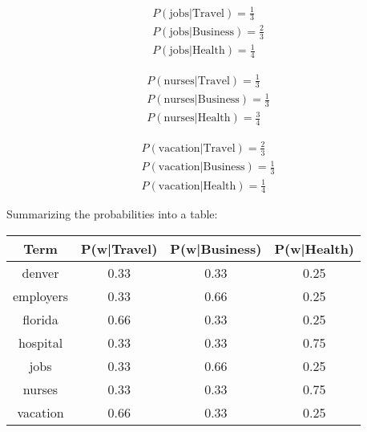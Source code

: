 \documentclass[11pt]{article}
\begin{document}
\begin{enumerate}
        \begin{align*}
            P(\text{jobs}|\text{Travel}) = \frac{1}{3} \\
            P(\text{jobs}|\text{Business}) = \frac{2}{3} \\
            P(\text{jobs}|\text{Health}) = \frac{1}{4}
        \end{align*}

        \begin{align*}
            P(\text{nurses}|\text{Travel}) = \frac{1}{3} \\
            P(\text{nurses}|\text{Business}) = \frac{1}{3} \\
            P(\text{nurses}|\text{Health}) = \frac{3}{4}
        \end{align*}

        \begin{align*}
            P(\text{vacation}|\text{Travel}) = \frac{2}{3} \\
            P(\text{vacation}|\text{Business}) = \frac{1}{3} \\
            P(\text{vacation}|\text{Health}) = \frac{1}{4}
        \end{align*}

        Summarizing the probabilities into a table: 

        \begin{table}[ht]
            \centering
            \begin{tabular}[t]{|c|c|c|c|}
                \hline
                \textbf{Term} & \textbf{P(w|Travel)} & \textbf{P(w|Business)} & \textbf{P(w|Health)}
                \\ \hline
                denver      & 0.33 & 0.33 & 0.25
                \\ \hline
                employers   & 0.33 & 0.66 & 0.25
                \\ \hline
                florida     & 0.66 & 0.33 & 0.25
                \\ \hline
                hospital    & 0.33 & 0.33 & 0.75
                \\ \hline
                jobs        & 0.33 & 0.66 & 0.25
                \\ \hline
                nurses      & 0.33 & 0.33 & 0.75
                \\ \hline
                vacation    & 0.66 & 0.33 & 0.25
                \\ \hline
            \end{tabular}
        \end{table}
        \newpage


\end{enumerate}
\end{document}
